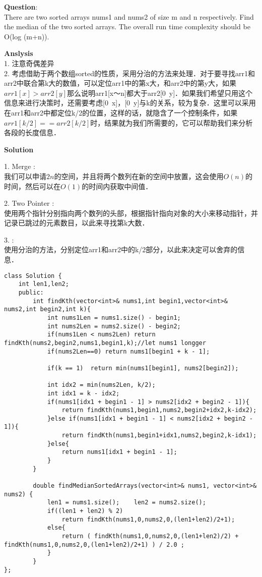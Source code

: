     
\begin{description}
    \item{\textbf{Question}}:\\%
		There are two sorted arrays nums1 and nums2 of size m and n respectively. Find the median of the two sorted arrays. The overall run time complexity should be O(log (m+n)).\\

    \item{\textbf{Anslysis}}\\
		1.	注意奇偶差异\\
		2.	考虑借助于两个数组sorted的性质，采用分治的方法来处理．对于要寻找arr1和arr2中联合第k大的数值，可以定位arr1中的第x大，和arr2中的第y大，如果$arr1[x] > arr2[y]$那么说明arr1[x～n]都大于arr2[0~y]．如果我们希望只用这个信息来进行决策时，还需要考虑[0~x]，[0~y]与k的关系，较为复杂．这里可以采用在arr1和arr2中都定位k/2的位置，这样的话，就隐含了一个控制条件，如果$arr1[k/2]==arr2[k/2]$时，结果就为我们所需要的，它可以帮助我们来分析各段的长度信息．\\
    \item{\textbf{Solution}}\\
	\item{1. Merge} : \\
		我们可以申请$2n$的空间，并且将两个数列在新的空间中放置，这会使用$O(n)$的时间，然后可以在$O(1)$的时间内获取中间值．
	\item{2. Two Pointer} : \\
		使用两个指针分别指向两个数列的头部，根据指针指向对象的大小来移动指针，并记录已跳过的元素数目，以此来寻找第k大数．
	\item{3. } : \\
		使用分治的方法，分别定位arr1和arr2中的k/2部分，以此来决定可以舍弃的信息．
		\begin{lstlisting}
class Solution {
	int len1,len2;
	public:
		int findKth(vector<int>& nums1,int begin1,vector<int>& nums2,int begin2,int k){
			int nums1Len = nums1.size() - begin1;
			int nums2Len = nums2.size() - begin2;
			if(nums1Len < nums2Len)	return findKth(nums2,begin2,nums1,begin1,k);//let nums1 longger
			if(nums2Len==0)	return nums1[begin1 + k - 1];

			if(k == 1)	return min(nums1[begin1], nums2[begin2]);

			int idx2 = min(nums2Len, k/2);
			int idx1 = k - idx2;
			if(nums1[idx1 + begin1 - 1] > nums2[idx2 + begin2 - 1]){
				return findKth(nums1,begin1,nums2,begin2+idx2,k-idx2);
			}else if(nums1[idx1 + begin1 - 1] < nums2[idx2 + begin2 - 1]){
				return findKth(nums1,begin1+idx1,nums2,begin2,k-idx1);
			}else{
				return nums1[idx1 + begin1 - 1];
			}
		}

		double findMedianSortedArrays(vector<int>& nums1, vector<int>& nums2) {
			len1 = nums1.size();	len2 = nums2.size();
			if((len1 + len2) % 2)
				return findKth(nums1,0,nums2,0,(len1+len2)/2+1);
			else{
				return ( findKth(nums1,0,nums2,0,(len1+len2)/2) + findKth(nums1,0,nums2,0,(len1+len2)/2+1) ) / 2.0 ;
			}
		}
};
		\end{lstlisting}
\end{description}

